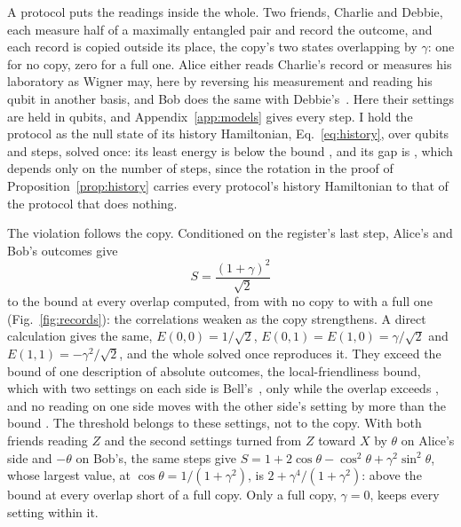 \documentclass[aps,prd,reprint,superscriptaddress]{revtex4-2}
\begin{document}
A protocol puts the readings inside the whole. Two friends, Charlie and Debbie, each measure half of a maximally entangled pair and record the outcome, and each record is copied outside its place, the copy's two states overlapping by $\gamma$: one for no copy, zero for a full one. Alice either reads Charlie's record or measures his laboratory as Wigner may, here by reversing his measurement and reading his qubit in another basis, and Bob does the same with Debbie's~\cite{Brukner2018}. Here their settings are held in qubits, and Appendix~\ref{app:models} gives every step. I hold the protocol as the null state of its history Hamiltonian, Eq.~\eqref{eq:history}, over  qubits and  steps, solved once: its least energy is below the bound , and its gap is , which depends only on the number of steps, since the rotation in the proof of Proposition~\ref{prop:history} carries every protocol's history Hamiltonian to that of the protocol that does nothing.

The violation follows the copy. Conditioned on the register's last step, Alice's and Bob's outcomes give
\begin{equation*}
  S = \frac{(1 + \gamma)^2}{\sqrt 2}
\end{equation*}
to the bound  at every overlap computed, from  with no copy to  with a full one (Fig.~\ref{fig:records}): the correlations weaken as the copy strengthens. A direct calculation gives the same, $E(0,0) = 1/\sqrt 2$, $E(0,1) = E(1,0) = \gamma/\sqrt 2$ and $E(1,1) = -\gamma^2/\sqrt 2$, and the whole solved once reproduces it. They exceed the bound  of one description of absolute outcomes, the local-friendliness bound, which with two settings on each side is Bell's~\cite{BongEtAl2020}, only while the overlap exceeds , and no reading on one side moves with the other side's setting by more than the bound . The threshold belongs to these settings, not to the copy. With both friends reading $Z$ and the second settings turned from $Z$ toward $X$ by $\theta$ on Alice's side and $-\theta$ on Bob's, the same steps give $S = 1 + 2\cos\theta - \cos^2\theta + \gamma^2\sin^2\theta$, whose largest value, at $\cos\theta = 1/(1 + \gamma^2)$, is $2 + \gamma^4/(1 + \gamma^2)$: above the bound at every overlap short of a full copy. Only a full copy, $\gamma = 0$, keeps every setting within it.
\end{document}
